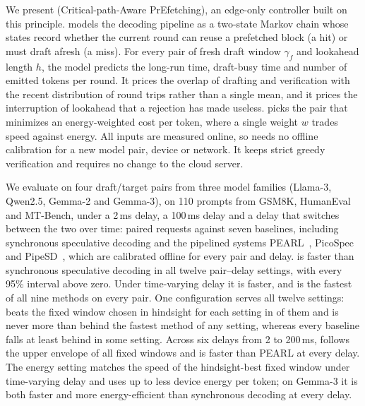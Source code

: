 We present \cape{} (Critical-path-Aware PrEfetching), an edge-only controller built on this principle. \cape{} models the decoding pipeline as a two-state Markov chain whose states record whether the current round can reuse a prefetched block (a hit) or must draft afresh (a miss). For every pair of fresh draft window $\gamma_f$ and lookahead length $h$, the model predicts the long-run time, draft-busy time and number of emitted tokens per round. It prices the overlap of drafting and verification with the recent distribution of round trips rather than a single mean, and it prices the interruption of lookahead that a rejection has made useless. \cape{} picks the pair that minimizes an energy-weighted cost per token, where a single weight $w$ trades speed against energy. All inputs are measured online, so \cape{} needs no offline calibration for a new model pair, device or network. It keeps strict greedy verification and requires no change to the cloud server.

We evaluate \cape{} on four draft/target pairs from three model families (Llama-3, Qwen2.5, Gemma-2 and Gemma-3), on 110 prompts from GSM8K, HumanEval and MT-Bench, under a 2\,ms delay, a 100\,ms delay and a delay that switches between the two over time:  paired requests against seven baselines, including synchronous speculative decoding and the pipelined systems PEARL~\cite{pearl2025}, PicoSpec~\cite{picospec2026} and PipeSD~\cite{pipesd2026}, which are calibrated offline for every pair and delay. \capes{} is  faster than synchronous speculative decoding in all twelve pair--delay settings, with every 95\% interval above zero. Under time-varying delay it is  faster, and \cape{} is the fastest of all nine methods on every pair. One configuration serves all twelve settings: \capes{} beats the fixed window chosen in hindsight for each setting in  of them and is never more than  behind the fastest method of any setting, whereas every baseline falls at least  behind in some setting. Across six delays from 2 to 200\,ms, \capes{} follows the upper envelope of all fixed windows and is faster than PEARL at every delay. The energy setting \capee{} matches the speed of the hindsight-best fixed window under time-varying delay and uses up to  less device energy per token; on Gemma-3 it is both faster and more energy-efficient than synchronous decoding at every delay.

